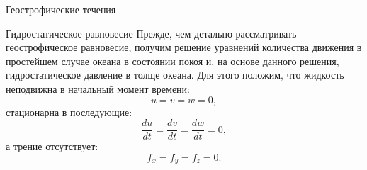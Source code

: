\begin{chapter}{Геострофические течения}

\begin{section}{Гидростатическое равновесие}
Прежде, чем детально рассматривать геострофическое равновесие, получим
решение уравнений количества движения в простейшем случае океана 
в состоянии покоя и, на основе данного решения, гидростатическое
давление в толще океана. Для этого положим, что жидкость
неподвижна в начальный момент времени:
\begin{equation}
  u = v = w = 0,
\end{equation}
стационарна в последующие:
\begin{equation}
 \frac{du}{dt}=\frac{dv}{dt}=\frac{dw}{dt} = 0,
\end{equation}
а трение отсутствует:
\begin{equation}
 f_x = f_y =f_z = 0.
\end{equation}
%


\end{section}
\end{chapter}
